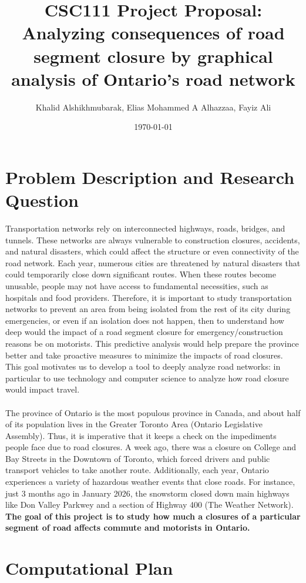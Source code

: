 \documentclass[fontsize=11pt]{article}
\title{CSC111 Project Proposal:  Analyzing consequences of road segment closure by graphical analysis of Ontario's road network}
\author{Khalid Alshikhmubarak, Elias Mohammed A Alhazzaa, Fayiz Ali}
\date{\today}
\begin{document}
\maketitle

\section*{Problem Description and Research Question}
\par
Transportation networks rely on interconnected highways, roads, bridges, and tunnels. These networks are always vulnerable to construction closures, accidents, and natural disasters, which could affect the structure or even connectivity of the road network. Each year, numerous cities are threatened by natural disasters that could temporarily close down  significant routes. When these routes become unusable, people may not have access to fundamental necessities, such as hospitals and food providers. Therefore, it is important to study transportation networks to prevent an area from being isolated from the rest of its city during emergencies, or even if an isolation does not happen, then to understand how deep would the impact of a road segment closure for emergency/construction reasons be on motorists. This predictive analysis would help prepare the province better and take proactive measures to minimize the impacts of road closures. This goal motivates us to develop a tool to deeply analyze road networks: in particular to use technology and computer science to analyze how road closure would impact travel.
\\\\
The province of Ontario is the most populous province in Canada, and about half of its population lives in the Greater Toronto Area (Ontario Legislative Assembly). Thus, it is imperative that it keeps a check on the impediments people face due to road closures. A week ago, there was a closure on College and Bay Streets in the Downtown of Toronto, which forced drivers and public transport vehicles to take another route. Additionally, each year, Ontario experiences a variety of hazardous weather events that close roads. For instance, just 3 months ago in January 2026, the snowstorm closed down main highways like Don Valley Parkwey and a section of Highway 400 (The Weather  Network). \textbf{The goal of this project is to study how much a closures of a particular segment of road affects commute and motorists in Ontario.}

\section*{Computational Plan}
\end{document}

